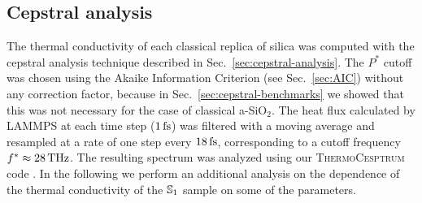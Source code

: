 \subsection{Cepstral analysis}  \label{sec:results-class-cepstral}
The thermal conductivity of each classical replica of silica was computed with the cepstral analysis technique described in Sec.~\ref{sec:cepstral-analysis}. 
The $P^*$ cutoff was chosen using the Akaike Information Criterion (see Sec.~\ref{sec:AIC}) without any correction factor, because in Sec.~\ref{sec:cepstral-benchmarks} we showed that this was not necessary for the case of classical a-SiO$_2$. 
The heat flux calculated by \textsc{LAMMPS} at each time step ($1\,\mathrm{fs}$) was filtered with a moving average and resampled at a rate of one step every $18\,\mathrm{fs}$, corresponding to a cutoff frequency $f^*\approx 28\,\mathrm{THz}$. The resulting spectrum was analyzed using our \textsc{ThermoCesptrum} code \cite{thermocepstrum}.
In the following we perform an additional analysis on the dependence of the thermal conductivity of the $\S1$ sample on some of the parameters. 

